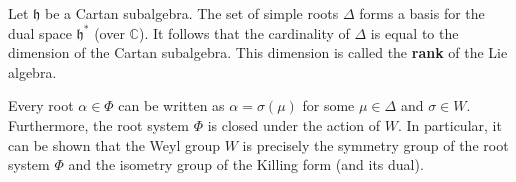     \begin{property}[Rank]
        Let $\mathfrak{h}$ be a Cartan subalgebra. The set of simple roots $\Delta$ forms a basis for the dual space $\mathfrak{h}^*$ (over $\mathbb{C}$). It follows that the cardinality of $\Delta$ is equal to the dimension of the Cartan subalgebra. This dimension is called the \textbf{rank} of the Lie algebra.
    \end{property}

    \begin{property}
        Every root $\alpha\in\Phi$ can be written as $\alpha = \sigma(\mu)$ for some $\mu\in\Delta$ and $\sigma\in W$. Furthermore, the root system $\Phi$ is closed under the action of $W$. In particular, it can be shown that the Weyl group $W$ is precisely the symmetry group of the root system $\Phi$ and the isometry group of the Killing form (and its dual).
    \end{property}

